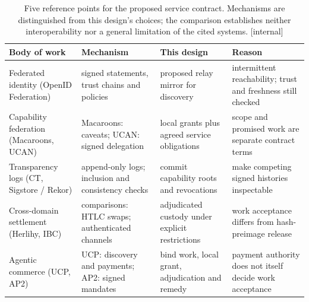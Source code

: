 \begin{table}[t]
\centering\footnotesize
\caption{Five reference points for the proposed service contract.
Mechanisms are distinguished from this design's choices; the comparison
establishes neither interoperability nor a general limitation of the cited
systems. [internal]}
\label{tab:fh-related-borrow-depart}
\setlength{\tabcolsep}{3pt}
\renewcommand{\arraystretch}{1.12}
\begin{tabularx}{\textwidth}{@{}>{\raggedright\arraybackslash}p{} >{\raggedright\arraybackslash}X >{\raggedright\arraybackslash}X >{\raggedright\arraybackslash}X@{}}
\toprule
\textbf{Body of work} & \textbf{Mechanism} & \textbf{This design} & \textbf{Reason} \\
\midrule
Federated identity (OpenID Federation) & signed statements, trust chains and policies & proposed relay mirror for discovery & intermittent reachability; trust and freshness still checked \\
Capability federation (Macaroons, UCAN) & Macaroons: caveats; UCAN: signed delegation & local grants plus agreed service obligations & scope and promised work are separate contract terms \\
Transparency logs (CT, Sigstore / Rekor) & append-only logs; inclusion and consistency checks & commit capability roots and revocations & make competing signed histories inspectable \\
Cross-domain settlement (Herlihy, IBC) & comparisons: HTLC swaps; authenticated channels & adjudicated custody under explicit restrictions & work acceptance differs from hash-preimage release \\
Agentic commerce (UCP, AP2) & UCP: discovery and payments; AP2: signed mandates & bind work, local grant, adjudication and remedy & payment authority does not itself decide work acceptance \\
\bottomrule
\end{tabularx}
\end{table}
